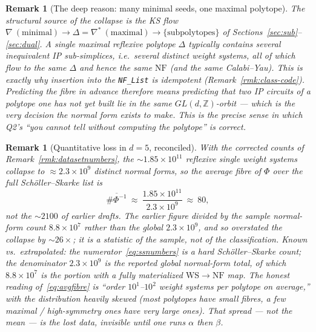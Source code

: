 \documentclass{amsart}
\newtheorem{remark}[theorem]{Remark}
\begin{document}
\begin{remark}[The deep reason: many minimal seeds, one maximal polytope]
\label{rmk:manyseeds}
The structural source of the collapse is the KS flow
$\nabla\ (\text{minimal})\to\Delta=\nabla^*\ (\text{maximal})\to
\{\text{subpolytopes}\}$ of Sections~\ref{sec:sub}--\ref{sec:dual}. A
\emph{single} maximal reflexive polytope $\Delta$ typically contains
\emph{several inequivalent} IP sub-simplices, i.e.\ several distinct weight
systems, all of which flow to the same $\Delta$ and hence the same
$\mathrm{NF}$ (and the same Calabi--Yau). This is exactly why insertion into the
\texttt{NF\_List} is idempotent (Remark~\ref{rmk:class-code}). Predicting the
fibre in advance therefore means \emph{predicting that two IP circuits of a
polytope one has not yet built lie in the same $GL(d,\mathbb Z)$-orbit} --- which
is the very decision the normal form exists to make. This is the precise sense
in which Q2's ``you cannot tell without computing the polytope'' is correct.
\end{remark}

\begin{remark}[Quantitative loss in $d=5$, reconciled]\label{rmk:fibrequant}
With the corrected counts of Remark~\ref{rmk:datasetnumbers}, the
$\sim$$1.85\times 10^{11}$ reflexive single weight systems collapse to
$\approx 2.3\times 10^{9}$ distinct normal forms, so the \emph{average} fibre of
$\Phi$ over the \emph{full} Sch\"oller--Skarke list is
\begin{equation}\label{eq:avgfibre}
  \overline{\#\Phi^{-1}}\ \approx\ \frac{1.85\times 10^{11}}{2.3\times 10^{9}}
  \ \approx\ 80 ,
\end{equation}
not the $\sim$$2100$ of earlier drafts. The earlier figure divided by the
\emph{sample} normal-form count $8.8\times 10^{7}$ rather than the global
$2.3\times 10^{9}$, and so overstated the collapse by $\sim$$26\times$; it is a
statistic of the sample, not of the classification. \emph{Known vs.\
extrapolated}: the numerator~\eqref{eq:ssnumbers} is a hard Sch\"oller--Skarke
count; the denominator $2.3\times 10^{9}$ is the reported global normal-form
total, of which $8.8\times 10^{7}$ is the portion with a fully materialized
$\mathrm{WS}\to\mathrm{NF}$ map. The honest reading of~\eqref{eq:avgfibre} is
``order $10^{1}$--$10^{2}$ weight systems per polytope on average,'' with the
distribution heavily skewed (most polytopes have small fibres, a few maximal /
high-symmetry ones have very large ones). That spread --- not the mean --- is
the lost data, invisible until one runs $\alpha$ then $\beta$.
\end{remark}
\end{document}
